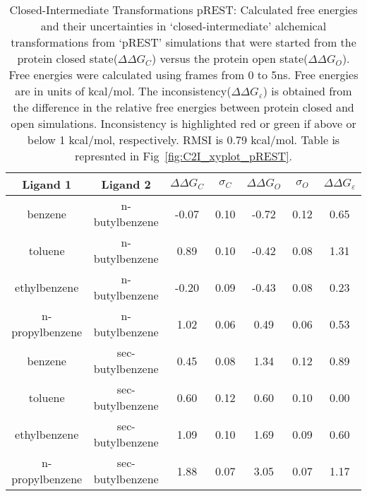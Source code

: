 \begin{table}[!htb]
 \centering
 \caption{Closed-Intermediate Transformations pREST:
 Calculated free energies and their uncertainties in `closed-intermediate' alchemical transformations from `pREST' simulations that were started from the protein closed state(\boldmath$\Delta\Delta G_{C}$) versus the protein open state(\boldmath$\Delta\Delta G_{O}$).
 Free energies were calculated using frames from 0 to 5ns. 
 Free energies are in units of kcal/mol.
 The inconsistency(\boldmath$\Delta\Delta G_{\varepsilon}$) is obtained from the difference in the relative free energies between protein closed and open simulations. 
 Inconsistency is highlighted red or green if above or below 1 kcal/mol, respectively.
 RMSI is 0.79 kcal/mol.
 Table is represnted in Fig~\ref{fig:C2I_xyplot_pREST}.
 }
 \label{tbl:C-I_pREST}
 \begin{tabular}{|c|c|c|c|c|c|c|}
 \hline
 \textbf{Ligand 1}       & \textbf{Ligand 2}    & \boldmath$\Delta\Delta G_{C}$ & \boldmath$\sigma_{C}$ & \boldmath$\Delta\Delta G_{O}$ & \boldmath$\sigma_{O}$ & \boldmath$\Delta\Delta G_{\varepsilon}$ \\ \hline
benzene         & n-butylbenzene   & -0.07   & 0.10     & -0.72     & 0.12     & \cellcolor[HTML]{9AFF99}0.65 \\ \hline
toluene         & n-butylbenzene   & 0.89    & 0.10     & -0.42     & 0.08     & \cellcolor[HTML]{FFCCC9}1.31 \\ \hline
ethylbenzene    & n-butylbenzene   & -0.20   & 0.09     & -0.43     & 0.08     & \cellcolor[HTML]{9AFF99}0.23 \\ \hline
n-propylbenzene & n-butylbenzene   & 1.02    & 0.06     & 0.49      & 0.06     & \cellcolor[HTML]{9AFF99}0.53 \\ \hline
benzene         & sec-butylbenzene & 0.45    & 0.08     & 1.34      & 0.12     & \cellcolor[HTML]{9AFF99}0.89 \\ \hline
toluene         & sec-butylbenzene & 0.60    & 0.12     & 0.60      & 0.10     & \cellcolor[HTML]{9AFF99}0.00 \\ \hline
ethylbenzene    & sec-butylbenzene & 1.09    & 0.10     & 1.69      & 0.09     & \cellcolor[HTML]{9AFF99}0.60 \\ \hline
n-propylbenzene & sec-butylbenzene & 1.88    & 0.07     & 3.05      & 0.07     & \cellcolor[HTML]{FFCCC9}1.17 \\ \hline
 \end{tabular}
 \end{table}


